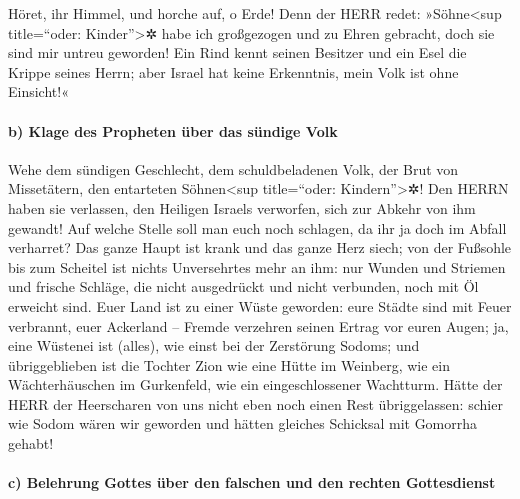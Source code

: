 Höret, ihr Himmel, und horche auf, o Erde! Denn der HERR
redet: »Söhne\textless sup title=``oder: Kinder''\textgreater✲ habe ich
großgezogen und zu Ehren gebracht, doch sie sind mir untreu geworden!
Ein Rind kennt seinen Besitzer und ein Esel die Krippe
seines Herrn; aber Israel hat keine Erkenntnis, mein Volk ist ohne
Einsicht!«

\hypertarget{b-klage-des-propheten-uxfcber-das-suxfcndige-volk}{%
\paragraph{b) Klage des Propheten über das sündige
Volk}\label{b-klage-des-propheten-uxfcber-das-suxfcndige-volk}}

Wehe dem sündigen Geschlecht, dem schuldbeladenen Volk,
der Brut von Missetätern, den entarteten Söhnen\textless sup
title=``oder: Kindern''\textgreater✲! Den HERRN haben sie verlassen, den
Heiligen Israels verworfen, sich zur Abkehr von ihm gewandt!
Auf welche Stelle soll man euch noch schlagen, da ihr ja
doch im Abfall verharret? Das ganze Haupt ist krank und das ganze Herz
siech; von der Fußsohle bis zum Scheitel ist nichts
Unversehrtes mehr an ihm: nur Wunden und Striemen und frische Schläge,
die nicht ausgedrückt und nicht verbunden, noch mit Öl erweicht sind.
Euer Land ist zu einer Wüste geworden: eure Städte sind
mit Feuer verbrannt, euer Ackerland -- Fremde verzehren seinen Ertrag
vor euren Augen; ja, eine Wüstenei ist (alles), wie einst bei der
Zerstörung Sodoms; und übriggeblieben ist die Tochter Zion
wie eine Hütte im Weinberg, wie ein Wächterhäuschen im Gurkenfeld, wie
ein eingeschlossener Wachtturm. Hätte der HERR der
Heerscharen von uns nicht eben noch einen Rest übriggelassen: schier wie
Sodom wären wir geworden und hätten gleiches Schicksal mit Gomorrha
gehabt!

\hypertarget{c-belehrung-gottes-uxfcber-den-falschen-und-den-rechten-gottesdienst}{%
\paragraph{c) Belehrung Gottes über den falschen und den rechten
Gottesdienst}\label{c-belehrung-gottes-uxfcber-den-falschen-und-den-rechten-gottesdienst}}

